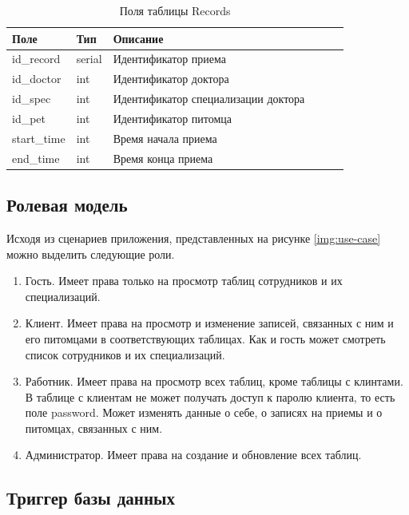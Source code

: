 \begin{table}[hbtp]
		\caption{\label{tab:records}Поля таблицы Records}
	\begin{center}
		\begin{tabular}{|l|l|l|l|l|l|}
			\hline {Поле} & {Тип} & {Описание}  \\ \hline
			id\_record  & serial & Идентификатор приема   \\ \hline
			id\_doctor & int & Идентификатор доктора  \\ \hline
			id\_spec & int & Идентификатор специализации доктора  \\ \hline
			id\_pet & int & Идентификатор питомца   \\ \hline
			start\_time & int & Время начала приема\\ \hline
			end\_time & int & Время конца приема\\ \hline
		\end{tabular}
	\end{center}
\end{table}

\pagebreak

\subsection{Ролевая модель}
Исходя из сценариев приложения, представленных на рисунке \ref{img:use-case} можно выделить следующие роли.
\begin{enumerate}[label=\arabic*)]
	\item Гость. Имеет права только на просмотр таблиц сотрудников и их специализаций.
	\item Клиент. Имеет права на просмотр и изменение записей, связанных с ним и его питомцами в соответствующих таблицах. Как и гость может смотреть список сотрудников и их специализаций.
	\item Работник. Имеет права на просмотр всех таблиц, кроме таблицы с клинтами. В таблице с клиентам не может получать доступ к паролю клиента, то есть поле password. Может изменять данные о себе, о записях на приемы и о питомцах, связанных с ним.
	\item Администратор. Имеет права на создание и обновление всех таблиц.
\end{enumerate}

\subsection{Триггер базы данных}

